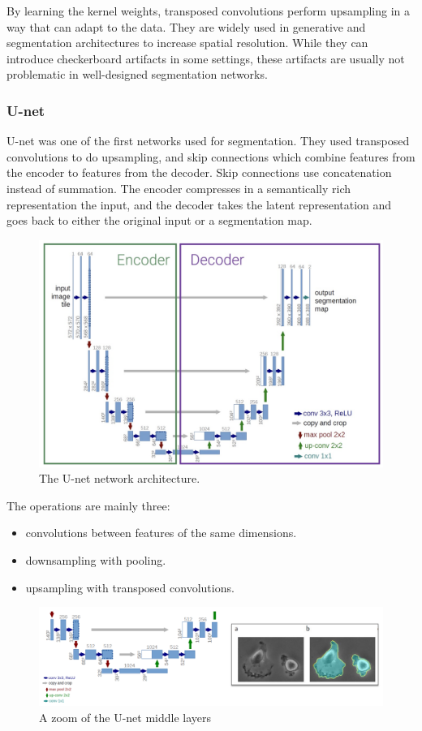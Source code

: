 By learning the kernel weights, transposed convolutions perform upsampling in a way that can adapt to the data.  They are widely used in generative and segmentation architectures to increase spatial resolution.  While they can introduce checkerboard artifacts in some settings, these artifacts are usually not problematic in well-designed segmentation networks.

\subsubsection{U-net}

U-net was one of the first networks used for segmentation.
They used transposed convolutions to do upsampling, and skip connections which combine features from the encoder to features from the decoder.
Skip connections use concatenation instead of summation.
The encoder compresses in a semantically rich representation the input, and the decoder takes the latent representation and goes back to either the original input or a segmentation map.

\begin{figure}[htbp]
  \centering
  \includegraphics[width=0.7\linewidth]{./img/unet.jpg}
  \caption{The U-net network architecture.}
\end{figure}

The operations are mainly three:
\begin{itemize}
  \item convolutions between features of the same dimensions.
  \item downsampling with pooling.
  \item upsampling with transposed convolutions.
\end{itemize}

\begin{figure}[htbp]
  \centering
  \includegraphics[width=0.7\linewidth]{./img/unet_zoom.png}
  \caption{A zoom of the U-net middle layers}
\end{figure}

